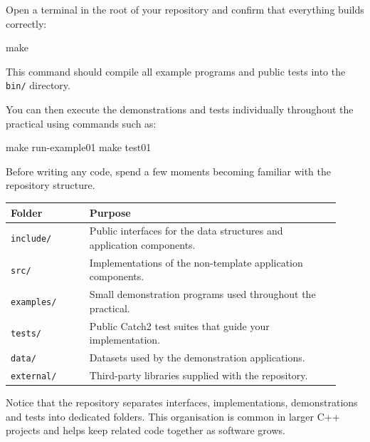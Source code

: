 \documentclass{csc2059practical}
\begin{document}
Open a terminal in the root of your repository and confirm that everything builds correctly:

\begin{terminal}
make
\end{terminal}

This command should compile all example programs and public tests into the \texttt{bin/} directory.

You can then execute the demonstrations and tests individually throughout the practical using commands such as:

\begin{terminal}
make run-example01
make test01
\end{terminal}



Before writing any code, spend a few moments becoming familiar with the repository structure.

\begin{center}
\begin{tabular}{p{0.22\linewidth}p{0.70\linewidth}}
\toprule
\textbf{Folder} & \textbf{Purpose} \\
\midrule
\texttt{include/} &
Public interfaces for the data structures and application components. \\

\texttt{src/} &
Implementations of the non-template application components. \\

\texttt{examples/} &
Small demonstration programs used throughout the practical. \\

\texttt{tests/} &
Public Catch2 test suites that guide your implementation. \\

\texttt{data/} &
Datasets used by the demonstration applications. \\

\texttt{external/} &
Third-party libraries supplied with the repository. \\
\bottomrule
\end{tabular}
\end{center}

\begin{tipbox}
Notice that the repository separates interfaces, implementations, demonstrations and tests into dedicated folders. This organisation is common in larger C++ projects and helps keep related code together as software grows.
\end{tipbox}
\end{document}
